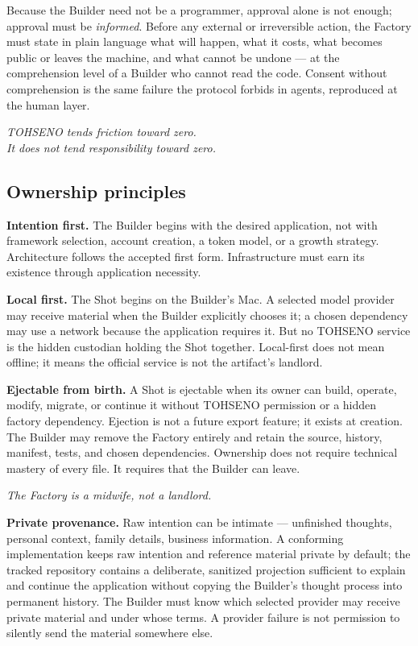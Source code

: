 \documentclass[11pt]{article}
\newenvironment{creed}
  {\begin{center}\begin{minipage}{0.86\textwidth}\itshape\large\centering}
  {\end{minipage}\end{center}\vspace{0.4em}}
\newcommand{\TOH}{TOHSENO}
\begin{document}
Because the Builder need not be a programmer, approval alone is not
enough; approval must be \emph{informed}. Before any external or
irreversible action, the Factory must state in plain language what will
happen, what it costs, what becomes public or leaves the machine, and
what cannot be undone --- at the comprehension level of a Builder who
cannot read the code. Consent without comprehension is the same failure
the protocol forbids in agents, reproduced at the human layer.

\begin{creed}
\TOH{} tends friction toward zero.\\
It does not tend responsibility toward zero.
\end{creed}

\subsection{Ownership principles}

\textbf{Intention first.} The Builder begins with the desired
application, not with framework selection, account creation, a token
model, or a growth strategy. Architecture follows the accepted first
form. Infrastructure must earn its existence through application
necessity.

\textbf{Local first.} The Shot begins on the Builder's Mac. A selected
model provider may receive material when the Builder explicitly chooses
it; a chosen dependency may use a network because the application
requires it. But no \TOH{} service is the hidden custodian holding the
Shot together. Local-first does not mean offline; it means the official
service is not the artifact's landlord.

\textbf{Ejectable from birth.} A Shot is ejectable when its owner can
build, operate, modify, migrate, or continue it without \TOH{}
permission or a hidden factory dependency. Ejection is not a future
export feature; it exists at creation. The Builder may remove the
Factory entirely and retain the source, history, manifest, tests, and
chosen dependencies. Ownership does not require technical mastery of
every file. It requires that the Builder can leave.

\begin{creed}
The Factory is a midwife, not a landlord.
\end{creed}

\textbf{Private provenance.} Raw intention can be intimate --- unfinished
thoughts, personal context, family details, business information. A
conforming implementation keeps raw intention and reference material
private by default; the tracked repository contains a deliberate,
sanitized projection sufficient to explain and continue the application
without copying the Builder's thought process into permanent history.
The Builder must know which selected provider may receive private
material and under whose terms. A provider failure is not permission to
silently send the material somewhere else.
\end{document}
